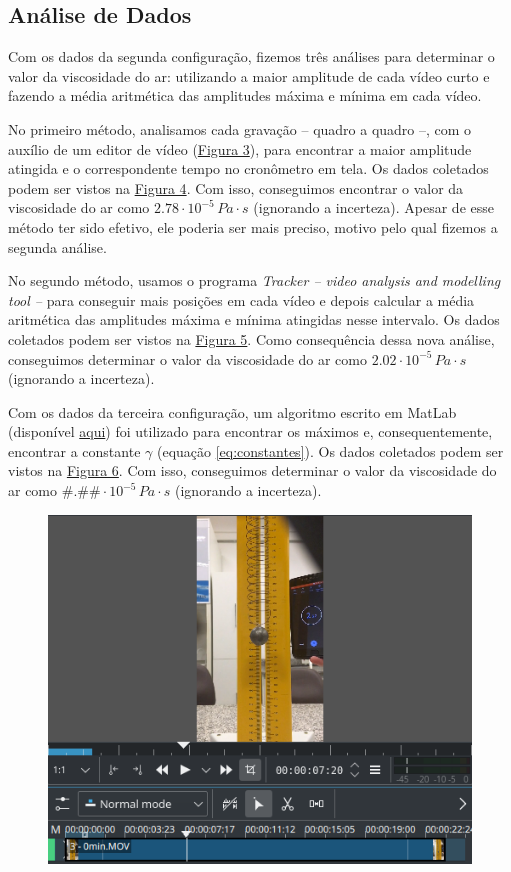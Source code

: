 \documentclass[a4paper, 12pt]{article}
\begin{document}
\begin{multicols}{2}
		\section{Análise de Dados} \label{sec:analise}
			\par Com os dados da segunda configuração, fizemos três análises para determinar o valor da viscosidade do ar: utilizando a maior amplitude de cada vídeo curto e fazendo a média aritmética das amplitudes máxima e mínima em cada vídeo.
			\par No primeiro método, analisamos cada gravação -- quadro a quadro --, com o auxílio de um editor de vídeo (\hyperref[img:quadros]{Figura 3}), para encontrar a maior amplitude atingida e o correspondente tempo no cronômetro em tela. Os dados coletados podem ser vistos na \hyperref[img:m1]{Figura 4}. Com isso, conseguimos encontrar o valor da viscosidade do ar como $2.78 \cdot 10^{-5} \, Pa \cdot s$ (ignorando a incerteza). Apesar de esse método ter sido efetivo, ele poderia ser mais preciso, motivo pelo qual fizemos a segunda análise.
			\par No segundo método, usamos o programa \textit{Tracker -- video analysis and modelling tool --} para conseguir mais posições em cada vídeo e depois calcular a média aritmética das amplitudes máxima e mínima atingidas nesse intervalo. Os dados coletados podem ser vistos na \hyperref[img:m2]{Figura 5}. Como consequência dessa nova análise, conseguimos determinar o valor da viscosidade do ar como $2.02 \cdot 10^{-5} \, Pa \cdot s$ (ignorando a incerteza).
			\par Com os dados da terceira configuração, um algoritmo escrito em MatLab (disponível \href{https://github.com/hugoalkimim/ViscosidadeDoAr/tree/master/Algoritmo}{aqui}) foi utilizado para encontrar os máximos e, consequentemente, encontrar a constante $\gamma$ (equação \hyperref[eq:constantes]{\ref{eq:constantes}}). Os dados coletados podem ser vistos na \hyperref[img:m3]{Figura 6}. Com isso, conseguimos determinar o valor da viscosidade do ar como $\#.\#\# \cdot 10^{-5} \, Pa \cdot s$ (ignorando a incerteza).
			\begin{figure}[H] \label{img:quadros}
				\centering
				\includegraphics[scale=0.4]{./img/quadros.png}

\end{figure}
\end{multicols}
\end{document}
